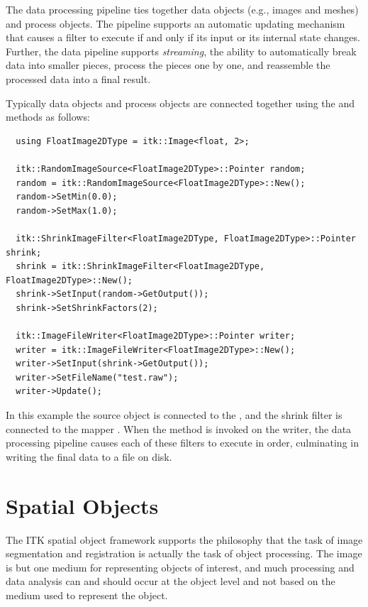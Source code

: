 The data processing pipeline ties together data objects (e.g., images and
meshes) and process objects. The pipeline supports an automatic updating
mechanism that causes a filter to execute if and only if its input
or its internal state changes. Further, the data pipeline supports
\emph{streaming}, the ability to automatically break data into smaller
pieces, process the pieces one by one, and reassemble the processed data into
a final result.

Typically data objects and process objects are connected together using the
 and  methods as follows:

\small
\begin{verbatim}
  using FloatImage2DType = itk::Image<float, 2>;

  itk::RandomImageSource<FloatImage2DType>::Pointer random;
  random = itk::RandomImageSource<FloatImage2DType>::New();
  random->SetMin(0.0);
  random->SetMax(1.0);

  itk::ShrinkImageFilter<FloatImage2DType, FloatImage2DType>::Pointer shrink;
  shrink = itk::ShrinkImageFilter<FloatImage2DType, FloatImage2DType>::New();
  shrink->SetInput(random->GetOutput());
  shrink->SetShrinkFactors(2);

  itk::ImageFileWriter<FloatImage2DType>::Pointer writer;
  writer = itk::ImageFileWriter<FloatImage2DType>::New();
  writer->SetInput(shrink->GetOutput());
  writer->SetFileName("test.raw");
  writer->Update();
\end{verbatim}
\normalsize

In this example the source object  is connected
to the , and the shrink filter is connected to
the mapper . When the  method is
invoked on the writer, the data processing pipeline causes each of these
filters to execute in order, culminating in writing the final data to a file on disk.


\section{Spatial Objects}%
\label{sec:SpatialObjectsOverview}%

The ITK spatial object framework supports the philosophy that the task of
image segmentation and registration is actually the task of object
processing. The image is but one medium for representing objects of interest,
and much processing and data analysis can and should occur at the object
level and not based on the medium used to represent the object.

